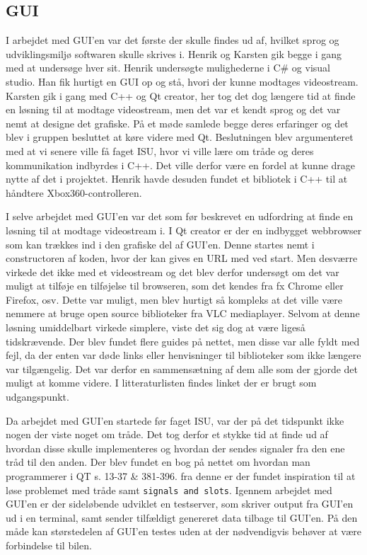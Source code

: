 \subsection{GUI}
\label{sec:gui}

I arbejdet med GUI’en var det første der skulle findes ud af, hvilket sprog og udviklingsmiljø softwaren skulle skrives i. Henrik og Karsten gik begge i gang med at undersøge hver sit. Henrik undersøgte mulighederne i C\# og visual studio. Han fik hurtigt en GUI op og stå, hvori der kunne modtages videostream. Karsten gik i gang med C++ og Qt creator, her tog det dog længere tid at finde en løsning til at modtage videostream, men det var et kendt sprog og det var nemt at designe det grafiske. På et møde samlede begge deres erfaringer og det blev i gruppen besluttet at køre videre med Qt. Beslutningen blev argumenteret med at vi senere ville få faget ISU, hvor vi ville lære om tråde og deres kommunikation indbyrdes i C++. Det ville derfor være en fordel at kunne drage nytte af det i projektet. Henrik havde desuden fundet et bibliotek i C++ til at håndtere Xbox360-controlleren.

I selve arbejdet med GUI’en var det som før beskrevet en udfordring at finde en løsning til at modtage videostream i. I Qt creator er der en indbygget webbrowser som kan trækkes ind i den grafiske del af GUI’en. Denne startes nemt i constructoren af koden, hvor der kan gives en URL med ved start. Men desværre virkede det ikke med et videostream og det blev derfor undersøgt om det var muligt at tilføje en tilføjelse til browseren, som det kendes fra fx Chrome eller Firefox, osv. Dette var muligt, men blev hurtigt så kompleks at det ville være nemmere at bruge open source biblioteker fra VLC mediaplayer. Selvom at denne løsning umiddelbart virkede simplere, viste det sig dog at være ligeså tidskrævende. Der blev fundet flere guides på nettet, men disse var alle fyldt med fejl, da der enten var døde links eller henvisninger til biblioteker som ikke længere var tilgængelig. Det var derfor en sammensætning af dem alle som der gjorde det muligt at komme videre. I litteraturlisten findes linket \cite{lib:vlc-using-qt} der er brugt som udgangspunkt. 

Da arbejdet med GUI’en startede før faget ISU, var der på det tidspunkt ikke nogen der viste noget om tråde. Det tog derfor et stykke tid at finde ud af hvordan disse skulle implementeres og hvordan der sendes signaler fra den ene tråd til den anden. Der blev fundet en bog på nettet om hvordan man programmerer i QT \cite{lib:qt-bog} s. 13-37 \& 381-396. fra denne er der fundet inspiration til at løse problemet med tråde samt \texttt{signals and slots}. Igennem arbejdet med GUI'en er der sideløbende udviklet en testserver, som skriver output fra GUI'en ud i en terminal, samt sender tilfældigt genereret data tilbage til GUI'en. På den måde kan størstedelen af GUI'en testes uden at der nødvendigvis behøver at være forbindelse til bilen. 

